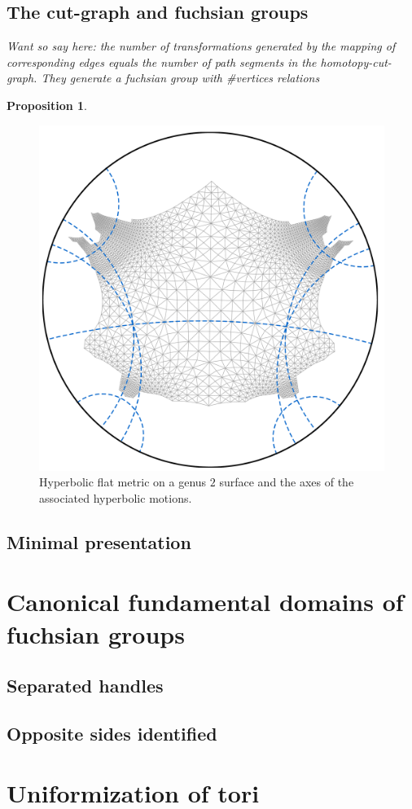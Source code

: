 \documentclass{article}
\newtheorem{proposition}{Proposition}
\begin{document}
\subsection{The cut-graph and fuchsian groups}
\emph{Want so say here: the number of transformations generated by the mapping of corresponding edges equals the number of path segments in the homotopy-cut-graph. They generate a fuchsian group with \#vertices relations}

\begin{proposition}
	
\end{proposition}

\begin{figure}
\centering
\includegraphics[width=0.4\linewidth]{cutCuttedBrezel01}
\caption{Hyperbolic flat metric on a genus $2$ surface and the axes of the associated hyperbolic motions.}
\label{fig:axes_of_motion}
\end{figure}

\subsection{Minimal presentation}

\section{Canonical fundamental domains of fuchsian groups}
\subsection{Separated handles}
\subsection{Opposite sides identified}

\section{Uniformization of tori}
\end{document}
